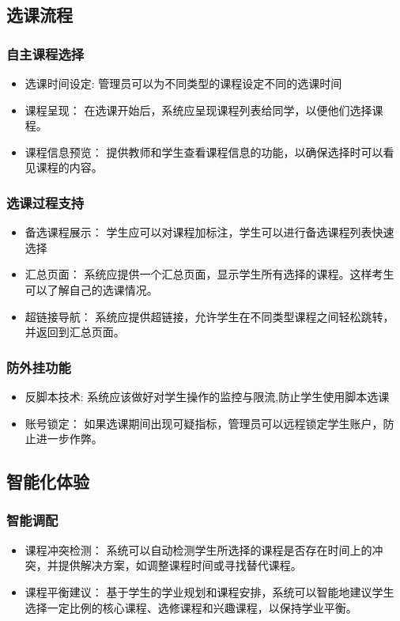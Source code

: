 \documentclass{article}
\begin{document}
\subsection{选课流程}
\subsubsection{自主课程选择}
\begin{itemize}
  \item 选课时间设定: 管理员可以为不同类型的课程设定不同的选课时间
  \item 课程呈现： 在选课开始后，系统应呈现课程列表给同学，以便他们选择课程。
  \item 课程信息预览： 提供教师和学生查看课程信息的功能，以确保选择时可以看见课程的内容。
\end{itemize}

\subsubsection{选课过程支持}
\begin{itemize}
  \item 备选课程展示： 学生应可以对课程加标注，学生可以进行备选课程列表快速选择
  \item 汇总页面： 系统应提供一个汇总页面，显示学生所有选择的课程。这样考生可以了解自己的选课情况。
  \item 超链接导航： 系统应提供超链接，允许学生在不同类型课程之间轻松跳转，并返回到汇总页面。
\end{itemize}

\subsubsection{防外挂功能}
\begin{itemize}
  \item 反脚本技术: 系统应该做好对学生操作的监控与限流,防止学生使用脚本选课
  \item 账号锁定： 如果选课期间出现可疑指标，管理员可以远程锁定学生账户，防止进一步作弊。
\end{itemize}

\subsection{智能化体验}
\subsubsection{智能调配}
\begin{itemize}
  \item 课程冲突检测： 系统可以自动检测学生所选择的课程是否存在时间上的冲突，并提供解决方案，如调整课程时间或寻找替代课程。
  \item 课程平衡建议： 基于学生的学业规划和课程安排，系统可以智能地建议学生选择一定比例的核心课程、选修课程和兴趣课程，以保持学业平衡。
\end{itemize}
\end{document}
